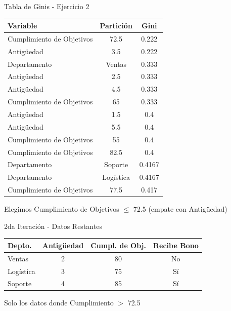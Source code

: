 \documentclass{beamer}
\begin{document}
\begin{frame}{Tabla de Ginis - Ejercicio 2}
    \begin{center}
        \begin{tabular}{lcc}
            \toprule
            Variable & Partición & Gini \\
            \midrule
            Cumplimiento de Objetivos & 72.5 & 0.222 \\
            Antigüedad & 3.5 & 0.222 \\
            Departamento & Ventas & 0.333 \\
            Antigüedad & 2.5 & 0.333 \\
            Antigüedad & 4.5 & 0.333 \\
            Cumplimiento de Objetivos & 65 & 0.333 \\
            Antigüedad & 1.5 & 0.4 \\
            Antigüedad & 5.5 & 0.4 \\
            Cumplimiento de Objetivos & 55 & 0.4 \\
            Cumplimiento de Objetivos & 82.5 & 0.4 \\
            Departamento & Soporte & 0.4167 \\
            Departamento & Logística & 0.4167 \\
            Cumplimiento de Objetivos & 77.5 & 0.417 \\
            \bottomrule
        \end{tabular}
    \end{center}
    
    \vspace{1em}
    
    \begin{center}
        \Large Elegimos Cumplimiento de Objetivos $\leq$ 72.5 (empate con Antigüedad)
    \end{center}
\end{frame}

\begin{frame}{2da Iteración - Datos Restantes}
    \begin{center}
        \begin{tabular}{lccc}
            \toprule
            Depto. & Antigüedad & Cumpl. de Obj. & Recibe Bono \\
            \midrule
            Ventas    & 2 & 80 & No \\
            Logística & 3 & 75 & Sí \\
            Soporte   & 4 & 85 & Sí \\
            \bottomrule
        \end{tabular}
    \end{center}
    
    \vspace{1em}
    
    \begin{center}
        \Large Solo los datos donde Cumplimiento $>$ 72.5
    \end{center}
\end{frame}
\end{document}
